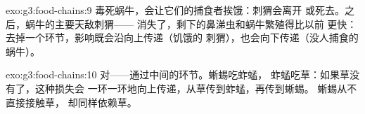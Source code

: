 \begin{solution}{exo:g3:food-chains:9}
毒死蜗牛，会让它们的捕食者挨饿：刺猬会离开
或死去。之后，蜗牛的主要天敌刺猬——
消失了，剩下的鼻涕虫和蜗牛繁殖得比以前
更快：去掉一个环节，影响既会沿向上传递（饥饿的
刺猬），也会向下传递（没人捕食的蜗牛）。
\end{solution}

\begin{solution}{exo:g3:food-chains:10}
对——通过中间的环节。蜥蜴吃蚱蜢，
蚱蜢吃草：如果草没有了，这种损失会
一环一环地向上传递，从草传到蚱蜢，再传到蜥蜴。
蜥蜴从不直接接触草，
却同样依赖草。
\end{solution}
